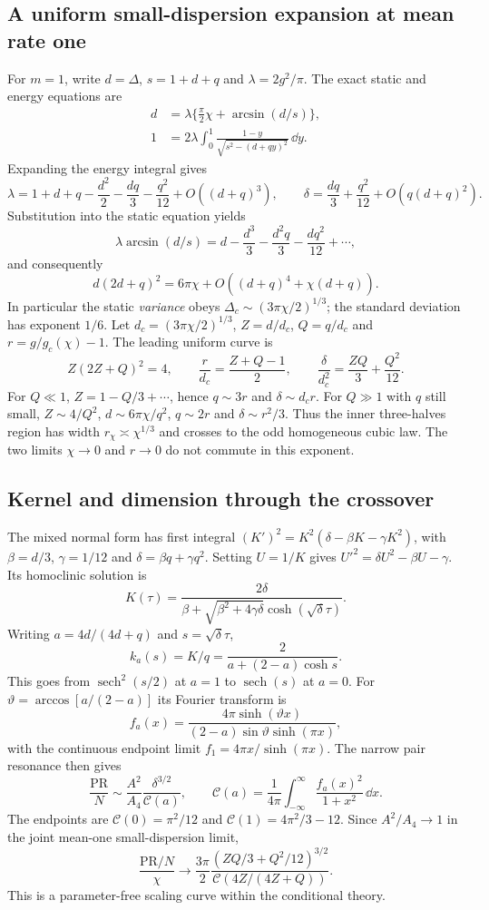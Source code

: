 \subsection{A uniform small-dispersion expansion at mean rate one}
For $m=1$, write $d=\Delta$, $s=1+d+q$ and
$\lambda=2g^2/\pi$. The exact static and energy equations are
\begin{align*}
 d&=\lambda\{\tfrac\pi2\chi+\arcsin(d/s)\},\\
 1&=2\lambda\int_0^1
       \frac{1-y}{\sqrt{s^2-(d+qy)^2}}\,\dd y.
\end{align*}
Expanding the energy integral gives
\[
 \lambda=1+d+q-\frac{d^2}2-\frac{dq}3-\frac{q^2}{12}
           +O((d+q)^3),\qquad
 \delta=\frac{dq}3+\frac{q^2}{12}+O(q(d+q)^2).
\]
Substitution into the static equation yields
\[
 \lambda\arcsin(d/s)
 =d-\frac{d^3}3-\frac{d^2q}3-\frac{dq^2}{12}+\cdots,
\]
and consequently
\[
 \boxed{d(2d+q)^2=6\pi\chi+O((d+q)^4+\chi(d+q)).}
\]
In particular the static \emph{variance} obeys
$\Delta_c\sim(3\pi\chi/2)^{1/3}$; the standard deviation has exponent $1/6$.
Let $d_c=(3\pi\chi/2)^{1/3}$, $Z=d/d_c$, $Q=q/d_c$ and
$r=g/g_c(\chi)-1$. The leading uniform curve is
\[
 Z(2Z+Q)^2=4,\qquad
 \frac r{d_c}=\frac{Z+Q-1}2,\qquad
 \frac\delta{d_c^2}=\frac{ZQ}3+\frac{Q^2}{12}.
\]
For $Q\ll1$, $Z=1-Q/3+\cdots$, hence $q\sim3r$ and $\delta\sim d_cr$.
For $Q\gg1$ with $q$ still small, $Z\sim4/Q^2$, $d\sim6\pi\chi/q^2$,
$q\sim2r$ and $\delta\sim r^2/3$. Thus the inner three-halves region has
width $r_\chi\asymp\chi^{1/3}$ and crosses to the odd homogeneous cubic law.
The two limits $\chi\to0$ and $r\to0$ do not commute in this exponent.

\subsection{Kernel and dimension through the crossover}
The mixed normal form has first integral
$(K')^2=K^2(\delta-\beta K-\gamma K^2)$, with
$\beta=d/3$, $\gamma=1/12$ and $\delta=\beta q+\gamma q^2$. Setting $U=1/K$
gives $U'^2=\delta U^2-\beta U-\gamma$. Its homoclinic solution is
\[
 K(\tau)=\frac{2\delta}
 {\beta+\sqrt{\beta^2+4\gamma\delta}\cosh(\sqrt\delta\tau)}.
\]
Writing $a=4d/(4d+q)$ and $s=\sqrt\delta\tau$,
\[
 k_a(s)=K/q=\frac2{a+(2-a)\cosh s}.
\]
This goes from $\operatorname{sech}^2(s/2)$ at $a=1$ to
$\operatorname{sech}(s)$ at $a=0$. For
$\vartheta=\arccos[a/(2-a)]$ its Fourier transform is
\[
 f_a(x)=\frac{4\pi\sinh(\vartheta x)}
 {(2-a)\sin\vartheta\sinh(\pi x)},
\]
with the continuous endpoint limit $f_1=4\pi x/\sinh(\pi x)$.
The narrow pair resonance then gives
\[
 \frac{\mathrm{PR}}N\sim\frac{A^2}{A_4}
       \frac{\delta^{3/2}}{\mathcal C(a)},\qquad
 \mathcal C(a)=\frac1{4\pi}\int_{-\infty}^\infty
                    \frac{f_a(x)^2}{1+x^2}\,\dd x.
\]
The endpoints are $\mathcal C(0)=\pi^2/12$ and
$\mathcal C(1)=4\pi^2/3-12$. Since $A^2/A_4\to1$ in the joint mean-one
small-dispersion limit,
\[
 \frac{\mathrm{PR}/N}{\chi}\longrightarrow
 \frac{3\pi}{2}\frac{(ZQ/3+Q^2/12)^{3/2}}
 {\mathcal C(4Z/(4Z+Q))}.
\]
This is a parameter-free scaling curve within the conditional theory.

